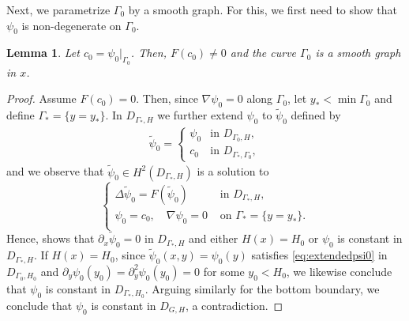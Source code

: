 \documentclass[11pt,reqno]{amsproc}
\numberwithin{equation}{section}
\numberwithin{theorem}{section}
\numberwithin{prop}{section}
\numberwithin{cor}{section}
\newtheorem{lemma}{Lemma}
\numberwithin{lemma}{section}
\theoremstyle{remark}
\theoremstyle{definition}
\begin{document}
Next, we parametrize $\Gamma_0$ by a smooth graph. For this, we first need to show that $\psi_0$ is non-degenerate on $\Gamma_0$.
\begin{lemma}\label{lemma:nonzeroFc0}
Let $c_0=\psi_0|_{\Gamma_0}$. Then, $F(c_0)\neq 0$ and the curve $\Gamma_0$ is a smooth graph in $x$.
\end{lemma}

\begin{proof}
Assume $F(c_0)=0$. Then, since $\nabla\psi_0=0$ along $\Gamma_0$, let $y_* < \min \Gamma_0$ and define $\Gamma_* = \lbrace y = y_* \rbrace$. In $D_{\Gamma_*,H}$ we further extend $\psi_0$ to $\widetilde{\psi}_0$ defined by
\begin{align*}
\widetilde{\psi}_0 = \begin{cases}
\psi_0 & \text{in }D_{\Gamma_0,H}, \\
c_0 & \text{in }D_{\Gamma_*,\Gamma_0},
\end{cases}
\end{align*}
and we observe that $\widetilde{\psi}_0\in H^2(D_{\Gamma_*,H})$ is a solution to
\begin{equation}\label{eq:extendedpsi0}
\begin{cases}
\Delta\widetilde{\psi}_0 = F(\widetilde{\psi}_0) & \text{ in } D_{\Gamma_*,H}, \\
\psi_0=c_0, \quad \nabla\psi_0=0  & \text{ on } \Gamma_*=\lbrace y = y_* \rbrace. \\
\end{cases}
\end{equation}
Hence, \cite[Lemma 3]{drivas2024islands} shows that $\partial_x\widetilde{\psi}_0=0$ in $D_{\Gamma_*,H}$ and either $H(x)=H_0$ or $\psi_0$ is constant in $D_{\Gamma_*,H}$. If $H(x)=H_0$, since $\widetilde{\psi}_0(x,y) = \psi_0(y)$ satisfies \eqref{eq:extendedpsi0} in $D_{\Gamma_0,H_0}$ and $\partial_y\psi_0(y_0)=\partial_y^2\psi_0(y_0)=0$ for some $y_0<H_0$, we likewise conclude that $\psi_0$ is constant in $D_{\Gamma_*,H_0}$. Arguing similarly for the bottom boundary, we conclude that $\psi_0$ is constant in $D_{G,H}$, a contradiction.



\end{proof}
\end{document}

